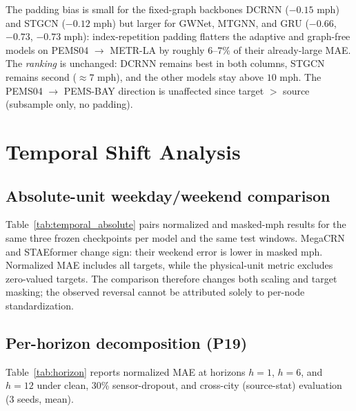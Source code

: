 The padding bias is small for the fixed-graph backbones DCRNN ($-0.15$ mph)
and STGCN ($-0.12$ mph) but larger for GWNet, MTGNN, and GRU
($-0.66$, $-0.73$, $-0.73$ mph): index-repetition padding flatters the
adaptive and graph-free models on PEMS04 $\to$ METR-LA by roughly $6$--$7\%$
of their already-large MAE. The \emph{ranking} is unchanged: DCRNN
remains best in both columns, STGCN remains second ($\approx 7$ mph), and
the other models stay above $10$ mph. The PEMS04 $\to$
PEMS-BAY direction is unaffected since target $>$ source (subsample only,
no padding).

\section{Temporal Shift Analysis}
\label{sec:appendix_temporal_group}

\subsection{Absolute-unit weekday/weekend comparison}
\label{sec:appendix_temporal_absolute}

Table~\ref{tab:temporal_absolute} pairs normalized and masked-mph results
for the same three frozen checkpoints per model and the same test windows.
MegaCRN and STAEformer change sign: their weekend error is lower in masked
mph. Normalized MAE includes all targets, while the physical-unit metric
excludes zero-valued targets. The comparison therefore changes both scaling
and target masking; the observed reversal cannot be attributed solely to
per-node standardization.



\subsection{Per-horizon decomposition (P19)}
\label{sec:appendix_horizon}

Table~\ref{tab:horizon} reports normalized MAE at horizons $h{=}1$, $h{=}6$, and
$h{=}12$ under clean, 30\% sensor-dropout, and cross-city (source-stat) evaluation
(3 seeds, mean).

